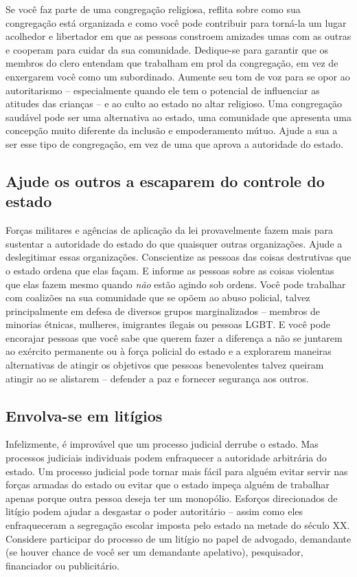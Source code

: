 Se você faz parte de uma congregação religiosa, reflita sobre como sua congregação está organizada e como você pode contribuir para torná-la um lugar acolhedor e libertador em que as pessoas constroem amizades umas com as outras e cooperam para cuidar da sua comunidade. Dedique-se para garantir que os membros do clero entendam que trabalham em prol da congregação, em vez de enxergarem você como um subordinado. Aumente seu tom de voz para se opor ao autoritarismo -- especialmente quando ele tem o potencial de influenciar as atitudes das crianças -- e ao culto ao estado no altar religioso. Uma congregação saudável pode ser uma alternativa ao estado, uma comunidade que apresenta uma concepção muito diferente da inclusão e empoderamento mútuo. Ajude a sua a ser esse tipo de congregação, em vez de uma que aprova a autoridade do estado.

\subsection*{Ajude os outros a escaparem do controle do estado}

Forças militares e agências de aplicação da lei provavelmente fazem mais para sustentar a autoridade do estado do que quaisquer outras organizações. Ajude a deslegitimar essas organizações. Conscientize as pessoas das coisas destrutivas que o estado ordena que elas façam. E informe as pessoas sobre as coisas violentas que elas fazem mesmo quando \emph{não} estão agindo sob ordens. Você pode trabalhar com coalizões na sua comunidade que se opõem ao abuso policial, talvez principalmente em defesa de diversos grupos marginalizados -- membros de minorias étnicas, mulheres, imigrantes ilegais ou pessoas LGBT. E você pode encorajar pessoas que você sabe que querem fazer a diferença a não se juntarem ao exército permanente ou à força policial do estado e a explorarem maneiras alternativas de atingir os objetivos que pessoas benevolentes talvez queiram atingir ao se alistarem -- defender a paz e fornecer segurança aos outros.

\subsection*{Envolva-se em litígios}

Infelizmente, é improvável que um processo judicial derrube o estado. Mas processos judiciais individuais podem enfraquecer a autoridade arbitrária do estado. Um processo judicial pode tornar mais fácil para alguém evitar servir nas forças armadas do estado ou evitar que o estado impeça alguém de trabalhar apenas porque outra pessoa deseja ter um monopólio. Esforços direcionados de litígio podem ajudar a desgastar o poder autoritário -- assim como eles enfraqueceram a segregação escolar imposta pelo estado na metade do século XX. Considere participar do processo de um litígio no papel de advogado, demandante (se houver chance de você ser um demandante apelativo), pesquisador, financiador ou publicitário.

